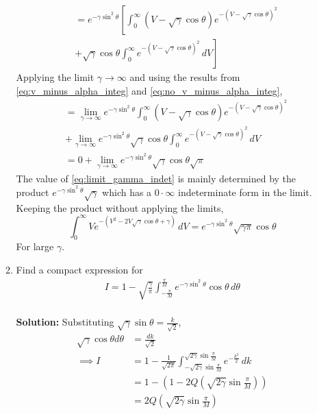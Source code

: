 \documentclass[journal,10pt,twocolumn]{IEEEtran}
\providecommand{\qfunc}[1]{\ensuremath{Q\left(#1\right)}}
\providecommand{\brak}[1]{\ensuremath{\left(#1\right)}}
\newcommand{\solution}{\noindent \textbf{Solution: }}
\begin{document}
\begin{enumerate}
\begin{enumerate}[label=(\alph{enumii})]
\begin{align*}
	&=e^{-\gamma\sin^2 \theta}\left[\int_{0}^{\infty}\brak{V-\sqrt{\gamma}\cos \theta}e^{-\brak{V - \sqrt{\gamma}\cos \theta}^2}\right.\\
	&\left.+\sqrt{\gamma}\cos \theta \int_{0}^{\infty}e^{-\brak{V - \sqrt{\gamma}\cos \theta}^2}\,dV\right]
\end{align*}
Applying the limit $\gamma \rightarrow \infty$ and using the results from \eqref{eq:v_minus_alpha_integ} and \eqref{eq:no_v_minus_alpha_integ},
\begin{align}
	\nonumber
	&=\lim_{\gamma \rightarrow \infty}e^{-\gamma\sin^2 \theta}\int_{0}^{\infty}\brak{V-\sqrt{\gamma}\cos \theta}e^{-\brak{V - \sqrt{\gamma}\cos \theta}^2}\\
	\nonumber
	&+\lim_{\gamma \rightarrow \infty}e^{-\gamma\sin^2 \theta}\sqrt{\gamma}\cos \theta \int_{0}^{\infty}e^{-\brak{V - \sqrt{\gamma}\cos \theta}^2}\,dV\\
	\label{eq:limit_gamma_indet}
	&=0+\lim_{\gamma \rightarrow \infty}e^{-\gamma\sin^2 \theta}\sqrt{\gamma}\cos \theta \sqrt{\pi}
\end{align}
The value of \eqref{eq:limit_gamma_indet} is mainly determined by the product $e^{-\gamma\sin^2 \theta}\sqrt{\gamma}$ which has a $0\cdot\infty$ %
indeterminate form in the limit. Keeping the product without applying the limits,
\begin{equation}
	\int_{0}^{\infty}Ve^{-\brak{V^2 - 2V \sqrt{\gamma}\cos \theta +\gamma}}\,dV = e^{-\gamma\sin^2 \theta}\sqrt{\gamma\pi}\cos \theta
	\label{eq:v_integral_large_gamma}
\end{equation}
For large $\gamma$.
\item
Find a compact expression for 
%
\begin{align}
I = 1 - \sqrt{\frac{\gamma}{\pi}}\int_{-\frac{\pi}{M}}^{\frac{\pi}{M}}e^{- \gamma\sin^2\theta }\cos \theta\, d\theta
\end{align}\\
\solution Substituting $\sqrt{\gamma}\sin \theta=\frac{k}{\sqrt{2}}$,
\begin{align}
	\nonumber
	\sqrt{\gamma}\cos \theta d\theta &= \frac{dk}{\sqrt{2}}\\
	\nonumber
	\implies I &= 1 - \frac{1}{\sqrt{2\pi}}\int_{-\sqrt{2\gamma}\sin \frac{\pi}{M}}^{\sqrt{2\gamma}\sin \frac{\pi}{M}}e^{-\frac{k^2}{2}}\, dk\\
	\nonumber
	&= 1 - \left(1 - 2\qfunc{\sqrt{2\gamma}\sin \frac{\pi}{M}}\right)\\
	\label{eq:I_sector_Q_func}
	&= 2\qfunc{\sqrt{2\gamma}\sin \frac{\pi}{M}}\\

\end{align}
\end{enumerate}
\end{enumerate}
\end{document}

